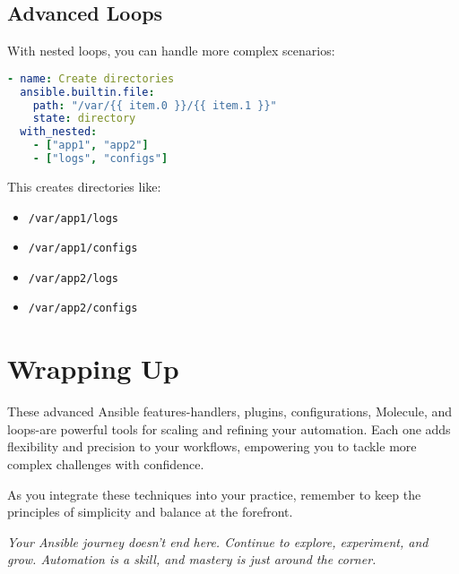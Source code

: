 \subsection{Advanced Loops}

With nested loops, you can handle more complex scenarios:
\begin{lstlisting}[language=yaml, caption=Nested Loops Example]
- name: Create directories
  ansible.builtin.file:
    path: "/var/{{ item.0 }}/{{ item.1 }}"
    state: directory
  with_nested:
    - ["app1", "app2"]
    - ["logs", "configs"]
\end{lstlisting}

This creates directories like:
\begin{itemize}
    \item \texttt{/var/app1/logs}
    \item \texttt{/var/app1/configs}
    \item \texttt{/var/app2/logs}
    \item \texttt{/var/app2/configs}
\end{itemize}


\section{Wrapping Up}

These advanced Ansible features-handlers, plugins, configurations, Molecule, and loops-are powerful tools for scaling and refining your automation. Each one adds flexibility and precision to your workflows, empowering you to tackle more complex challenges with confidence.

As you integrate these techniques into your practice, remember to keep the principles of simplicity and balance at the forefront.

\vspace{1em}

\textit{Your Ansible journey doesn't end here. Continue to explore, experiment, and grow. Automation is a skill, and mastery is just around the corner.}
